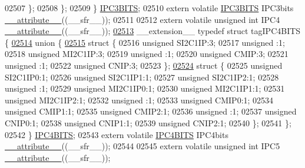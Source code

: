 \begin{DoxyCode}
02507     \};
02508   \};
02509 \} \hyperlink{a00008_dc/d2b/a00546}{IPC3BITS};
02510 \textcolor{keyword}{extern} \textcolor{keyword}{volatile} \hyperlink{a00008_dc/d2b/a00546}{IPC3BITS} IPC3bits \hyperlink{a00009_a493c46f03454991ccc5aa7a6e1dfb2a7}{\_\_attribute\_\_}((\_\_sfr\_\_));
02511 
02512 \textcolor{keyword}{extern} \textcolor{keyword}{volatile} \textcolor{keywordtype}{unsigned} \textcolor{keywordtype}{int}  IPC4 \hyperlink{a00009_a493c46f03454991ccc5aa7a6e1dfb2a7}{\_\_attribute\_\_}((\_\_sfr\_\_));
\hypertarget{a00009_source_l02513}{}\hyperlink{a00008}{02513} \_\_extension\_\_ \textcolor{keyword}{typedef} \textcolor{keyword}{struct }tagIPC4BITS \{
\hypertarget{a00009_source_l02514}{}\hyperlink{a00009}{02514}   \textcolor{keyword}{union }\{
\hypertarget{a00009_source_l02515}{}\hyperlink{a00009}{02515}     \textcolor{keyword}{struct }\{
02516       \textcolor{keywordtype}{unsigned} SI2C1IP:3;
02517       \textcolor{keywordtype}{unsigned} :1;
02518       \textcolor{keywordtype}{unsigned} MI2C1IP:3;
02519       \textcolor{keywordtype}{unsigned} :1;
02520       \textcolor{keywordtype}{unsigned} CMIP:3;
02521       \textcolor{keywordtype}{unsigned} :1;
02522       \textcolor{keywordtype}{unsigned} CNIP:3;
02523     \};
\hypertarget{a00009_source_l02524}{}\hyperlink{a00009}{02524}     \textcolor{keyword}{struct }\{
02525       \textcolor{keywordtype}{unsigned} SI2C1IP0:1;
02526       \textcolor{keywordtype}{unsigned} SI2C1IP1:1;
02527       \textcolor{keywordtype}{unsigned} SI2C1IP2:1;
02528       \textcolor{keywordtype}{unsigned} :1;
02529       \textcolor{keywordtype}{unsigned} MI2C1IP0:1;
02530       \textcolor{keywordtype}{unsigned} MI2C1IP1:1;
02531       \textcolor{keywordtype}{unsigned} MI2C1IP2:1;
02532       \textcolor{keywordtype}{unsigned} :1;
02533       \textcolor{keywordtype}{unsigned} CMIP0:1;
02534       \textcolor{keywordtype}{unsigned} CMIP1:1;
02535       \textcolor{keywordtype}{unsigned} CMIP2:1;
02536       \textcolor{keywordtype}{unsigned} :1;
02537       \textcolor{keywordtype}{unsigned} CNIP0:1;
02538       \textcolor{keywordtype}{unsigned} CNIP1:1;
02539       \textcolor{keywordtype}{unsigned} CNIP2:1;
02540     \};
02541   \};
02542 \} \hyperlink{a00008_d5/d21/a00549}{IPC4BITS};
02543 \textcolor{keyword}{extern} \textcolor{keyword}{volatile} \hyperlink{a00008_d5/d21/a00549}{IPC4BITS} IPC4bits \hyperlink{a00009_a493c46f03454991ccc5aa7a6e1dfb2a7}{\_\_attribute\_\_}((\_\_sfr\_\_));
02544 
02545 \textcolor{keyword}{extern} \textcolor{keyword}{volatile} \textcolor{keywordtype}{unsigned} \textcolor{keywordtype}{int}  IPC5 \hyperlink{a00009_a493c46f03454991ccc5aa7a6e1dfb2a7}{\_\_attribute\_\_}((\_\_sfr\_\_));

\end{DoxyCode}
